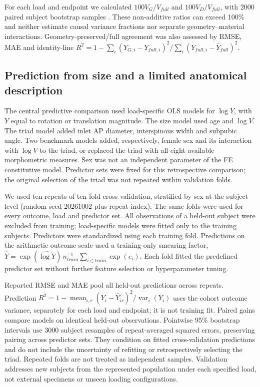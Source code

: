 For each load and endpoint we calculated $100V_G/V_{full}$ and $100V_D/V_{full}$, with 2000 paired subject bootstrap samples \citep{EfronTibshirani1994}. These non-additive ratios can exceed 100\% and neither estimate causal variance fractions nor separate geometry--material interactions. Geometry-preserved/full agreement was also assessed by RMSE, MAE and identity-line $R^2=1-\sum_i(Y_{G,i}-Y_{full,i})^2/\sum_i(Y_{full,i}-\bar Y_{full})^2$.

\subsection{Prediction from size and a limited anatomical description}
The central predictive comparison used load-specific OLS models for $\log Y$, with $Y$ equal to rotation or translation magnitude. The size model used age and $\log V$. The triad model added inlet AP diameter, interspinous width and subpubic angle. Two benchmark models added, respectively, female sex and its interaction with $\log V$ to the triad, or replaced the triad with all eight available morphometric measures. Sex was not an independent parameter of the FE constitutive model. Predictor sets were fixed for this retrospective comparison; the original selection of the triad was not repeated within validation folds.

We used ten repeats of ten-fold cross-validation, stratified by sex at the subject level (random seed 20261002 plus repeat index). The same folds were used for every outcome, load and predictor set. All observations of a held-out subject were excluded from training; load-specific models were fitted only to the training subjects. Predictors were standardized using each training fold. Predictions on the arithmetic outcome scale used a training-only smearing factor, $\widehat Y=\exp(\widehat{\log Y})\,n_{train}^{-1}\sum_{i\in train}\exp(e_i)$. Each fold fitted the predefined predictor set without further feature selection or hyperparameter tuning.

Reported RMSE and MAE pool all held-out predictions across repeats. Prediction $R^2=1-\operatorname{mean}_{i,r}(Y_i-\widehat Y_{ir})^2/\operatorname{var}_i(Y_i)$ uses the cohort outcome variance, separately for each load and endpoint; it is not training fit. Paired gains compare models on identical held-out observations. Pointwise 95\% bootstrap intervals use 3000 subject resamples of repeat-averaged squared errors, preserving pairing across predictor sets. They condition on fitted cross-validation predictions and do not include the uncertainty of refitting or retrospectively selecting the triad. Repeated folds are not treated as independent samples. Validation addresses new subjects from the represented population under each specified load, not external specimens or unseen loading configurations.

